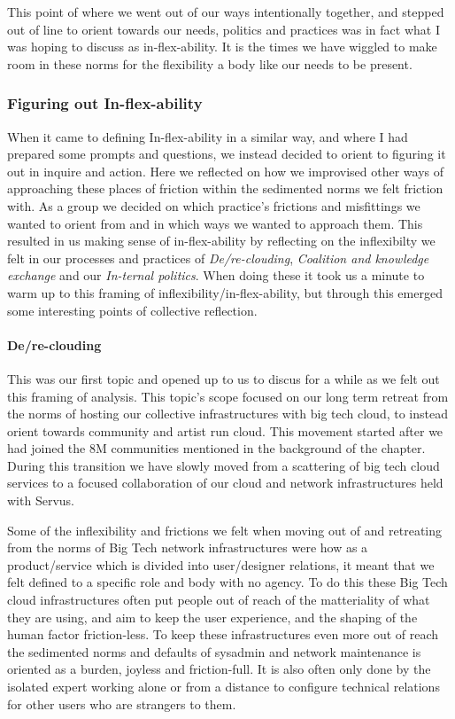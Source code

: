 This point of where we went out of our ways intentionally together, and
stepped out of line to orient towards our needs, politics and practices
was in fact what I was hoping to discuss as in-flex-ability. It is the
times we have wiggled to make room in these norms for the flexibility a
body like our needs to be present.

\hypertarget{figuring-out-in-flex-ability}{%
\subsubsection{Figuring out
In-flex-ability}\label{figuring-out-in-flex-ability}}

When it came to defining In-flex-ability in a similar way, and where I
had prepared some prompts and questions, we instead decided to orient to
figuring it out in inquire and action. Here we reflected on how we
improvised other ways of approaching these places of friction within the
sedimented norms we felt friction with. As a group we decided on which
practice's frictions and misfittings we wanted to orient from and in
which ways we wanted to approach them. This resulted in us making sense
of in-flex-ability by reflecting on the inflexibilty we felt in our
processes and practices of \emph{De/re-clouding}, \emph{Coalition and
knowledge exchange} and our \emph{In-ternal politics}. When doing these
it took us a minute to warm up to this framing of
inflexibility/in-flex-ability, but through this emerged some interesting
points of collective reflection.

\hypertarget{dere-clouding}{%
\paragraph{De/re-clouding}\label{dere-clouding}}

This was our first topic and opened up to us to discus for a while as we
felt out this framing of analysis. This topic's scope focused on our
long term retreat from the norms of hosting our collective
infrastructures with big tech cloud, to instead orient towards community
and artist run cloud. This movement started after we had joined the 8M
communities mentioned in the background of the chapter. During this
transition we have slowly moved from a scattering of big tech cloud
services to a focused collaboration of our cloud and network
infrastructures held with Servus.

Some of the inflexibility and frictions we felt when moving out of and
retreating from the norms of Big Tech network infrastructures were how
as a product/service which is divided into user/designer relations, it
meant that we felt defined to a specific role and body with no agency.
To do this these Big Tech cloud infrastructures often put people out of
reach of the matteriality of what they are using, and aim to keep the
user experience, and the shaping of the human factor friction-less. To
keep these infrastructures even more out of reach the sedimented norms
and defaults of sysadmin and network maintenance is oriented as a
burden, joyless and friction-full. It is also often only done by the
isolated expert working alone or from a distance to configure technical
relations for other users who are strangers to them.

